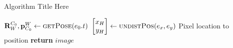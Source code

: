 \begin{algorithm}[tb!]
	\caption{Algorithm Title Here}
	\label{alg:algorithmRefName}
	\begin{algorithmic}[1] %
		\State $\mathbf{R}^{C_0}_W,\mathbf{p}^W_{C_0} \gets \textsc{getPose}(e_0.t)$	
		 
		\State $\begin{bmatrix}x_H \\ y_H \end{bmatrix}  \gets \textsc{undistPos}(e_x,e_y)$ \Comment Pixel location to position
		\label{alg:line:lineRefName} %
		\EndFor
		\State \textbf{return} $image$
		\EndFunction
	\end{algorithmic}
\end{algorithm}
